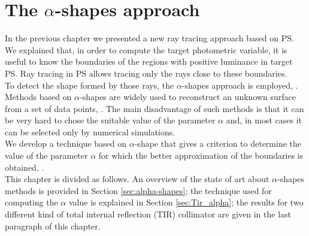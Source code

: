 \chapter{The $\alpha$-shapes approach}\label{chap:boundaries_alpha}
In the previous chapter we presented a new ray tracing approach based on PS. We explained that, in order to compute the target photometric variable, it is useful to know the boundaries of the regions with positive luminance in target PS. Ray tracing in PS allows tracing only the rays close to these boundaries. 
\\ \indent To detect the shape formed by those rays, the $\alpha$-shapes approach is employed, \cite{portegies2013fast}. 
Methods based on $\alpha$-shapes are widely used to reconstruct an unknown surface from a set of data points, \cite{guo1997surface}. 
The main disadvantage of such methods is that it can be very hard to chose the suitable value of the parameter $\alpha$ and, in most cases it can be selected only by numerical simulations.\\ \indent
We develop a technique based on $\alpha$-shape that gives a criterion to determine the value of the parameter $\alpha$ for which the better approximation of the boundaries is obtained, \cite{filosa2015new}.\\ \indent This chapter is divided as follows. An overview of the state of art about $\alpha$-shapes methods is provided in Section \ref{sec:alpha-shapes}; the technique used for computing the $\alpha$ value is explained in Section \ref{sec:Tir_alpha}; the results for two different kind of total internal reflection (TIR) collimator are given in the last paragraph of this chapter.
